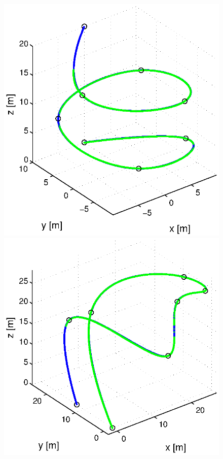 \begin{figure}[H]
\begin{minipage}[t]{0.32\textwidth}
    \includegraphics[width = \textwidth]{trackings_wc/figure_3D_helix_SplineDegree3_purePursuit_Disturbance_0}
  \end{minipage}
  \hfill
  \begin{minipage}[t]{0.32\textwidth}
    \includegraphics[width = \textwidth]{trackings_wc/figure_3D_agile_SplineDegree3_purePursuit_Disturbance_0}

\end{minipage}
\end{figure}
